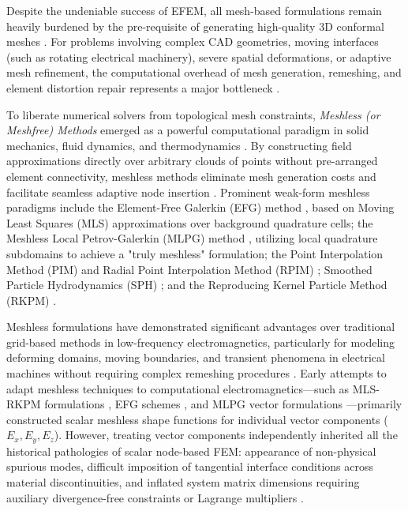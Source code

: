 \documentclass[preprint,12pt]{elsarticle}
\begin{document}
Despite the undeniable success of EFEM, all mesh-based formulations remain heavily burdened by the pre-requisite of generating high-quality 3D conformal meshes \cite{idelsohn2006mesh, liu2009mesh}. For problems involving complex CAD geometries, moving interfaces (such as rotating electrical machinery), severe spatial deformations, or adaptive mesh refinement, the computational overhead of mesh generation, remeshing, and element distortion repair represents a major bottleneck \cite{idelsohn2006mesh, liu2009mesh, slak2018refined}.

To liberate numerical solvers from topological mesh constraints, \emph{Meshless (or Meshfree) Methods} emerged as a powerful computational paradigm in solid mechanics, fluid dynamics, and thermodynamics \cite{liu2009mesh, liu2005introduction, atluri2002meshless}. By constructing field approximations directly over arbitrary clouds of points without pre-arranged element connectivity, meshless methods eliminate mesh generation costs and facilitate seamless adaptive node insertion \cite{liu2009mesh, belytschko1994element}. Prominent weak-form meshless paradigms include the Element-Free Galerkin (EFG) method \cite{belytschko1994element}, based on Moving Least Squares (MLS) approximations over background quadrature cells; the Meshless Local Petrov-Galerkin (MLPG) method \cite{atluri1998new, atluri2002meshless}, utilizing local quadrature subdomains to achieve a "truly meshless" formulation; the Point Interpolation Method (PIM) and Radial Point Interpolation Method (RPIM) \cite{liu2001point, liu2005introduction}; Smoothed Particle Hydrodynamics (SPH) \cite{monaghan1992smoothed}; and the Reproducing Kernel Particle Method (RKPM) \cite{liu2009mesh}.

Meshless formulations have demonstrated significant advantages over traditional grid-based methods in low-frequency electromagnetics, particularly for modeling deforming domains, moving boundaries, and transient phenomena in electrical machines without requiring complex remeshing procedures \cite{viana1999moving, parreira2006element, coppoli2012induction}. Early attempts to adapt meshless techniques to computational electromagnetics---such as MLS-RKPM formulations \cite{viana1999moving}, EFG schemes \cite{cingoski1998element, parreira2006element}, and MLPG vector formulations \cite{atluri2002meshless,fonseca2008imposing, nicomedes2012meshless}---primarily constructed scalar meshless shape functions for individual vector components ($E_x, E_y, E_z$). However, treating vector components independently inherited all the historical pathologies of scalar node-based FEM: appearance of non-physical spurious modes, difficult imposition of tangential interface conditions across material discontinuities, and inflated system matrix dimensions requiring auxiliary divergence-free constraints or Lagrange multipliers \cite{nicomedes2015mixed, lima2016metodos, ortiz2023tese}.
\end{document}
